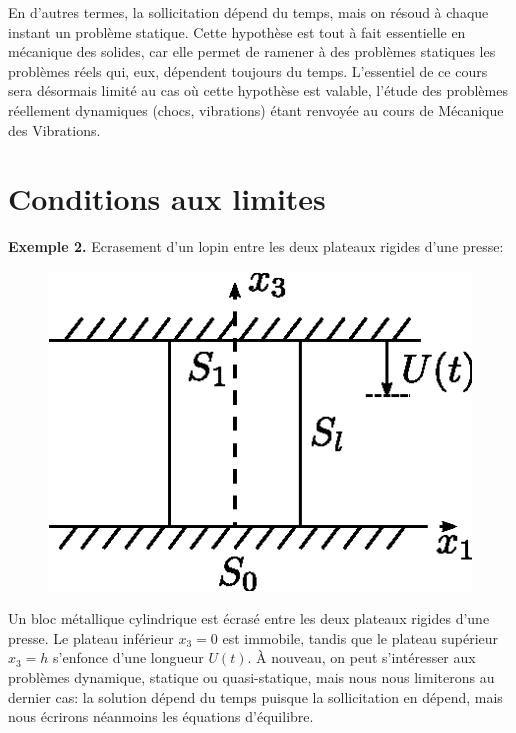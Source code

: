 \begin{enumerate}
        En d'autres termes, la sollicitation dépend du temps, mais on résoud à chaque instant un problème statique.
        Cette hypothèse est tout à fait essentielle en mécanique des solides, car elle permet de ramener à des problèmes statiques les problèmes réels qui, eux, dépendent toujours du temps.
        L'essentiel de ce cours sera désormais limité au cas où cette hypothèse est valable, l'étude des problèmes réellement dynamiques (chocs, vibrations) étant renvoyée au cours de Mécanique des Vibrations.
\end{enumerate}
\section{Conditions aux limites}
\textbf{Exemple 2.} Ecrasement d'un lopin entre les deux plateaux rigides d'une presse:
\begin{figure}
    \begin{center}
        \includegraphics{../images/T1_Ch04-0002}
    \end{center}
\end{figure}
Un bloc métallique cylindrique est écrasé entre les deux plateaux rigides d'une presse.
Le plateau inférieur $x_3 =0$ est immobile, tandis que le plateau supérieur $x_3 =h$ s'enfonce d'une longueur $U(t)$.
À nouveau, on peut s'intéresser aux problèmes dynamique, statique ou quasi-statique, mais nous nous limiterons au dernier cas: la solution dépend du temps puisque la sollicitation en dépend, mais nous écrirons néanmoins les équations d'équilibre.

